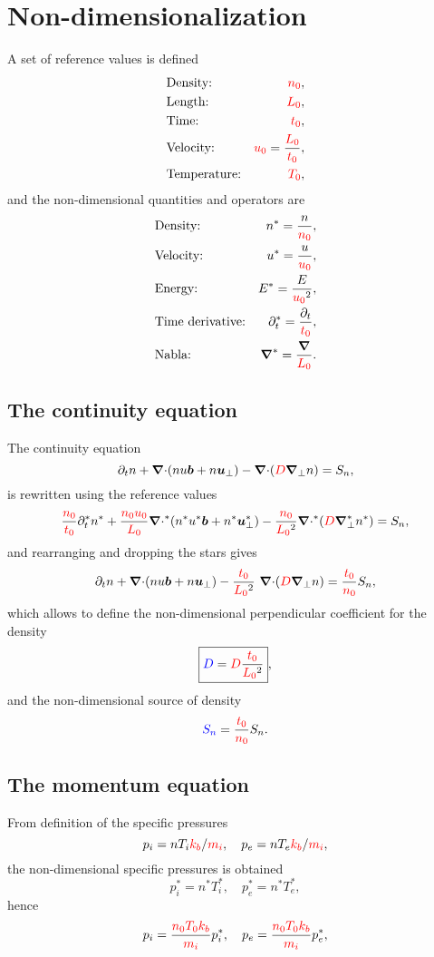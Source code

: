 \documentclass[a4paper,10pt]{article}
\newcommand{\bm}[1]{\text{\boldmath$#1$\unboldmath}}
\newcommand{\bu}{\bm{u}}
\newcommand{\Div}{{\bm{\nabla}\cdot}}
\newcommand{\Grad}{\bm{\nabla}}
\renewcommand{\b}{\bm{b}}
\newcommand{\Gradper}{\Grad_{\perp}}
\newcommand{\yd}[1]{{\color{red} #1\color{black}}} %
\newcommand{\nd}[1]{{\color{blue} #1\color{black}}} %
\def\Lz{\yd{L_0}}
\def\tz{\yd{t_0}}
\def\nz{\yd{n_0}}
\def\uz{\yd{u_0}}
\def\Tz{\yd{T_0}}
\def\kb{\yd{k_b}}
\def\mi{\yd{m_i}}
\def\drho{\yd{D}}
\def\drhoa{\nd{D}}
\begin{document}
\section{Non-dimensionalization}
A set of reference values is defined
\begin{align*}
 &\text{Density:}     & \nz,\\
 &\text{Length:}      & \Lz,\\
 &\text{Time:}        & \tz,\\
 &\text{Velocity:}    & \uz=\frac{\Lz}{\tz},\\
 &\text{Temperature:} & \Tz,\\
\end{align*}
and the non-dimensional quantities and operators are
\begin{align*}
 &\text{Density:}          & n^*=\frac{n}{\nz},\\
 &\text{Velocity:}           & u^*=\frac{u}{\uz},\\
 &\text{Energy:}           & E^*=\frac{E}{\uz^2},\\
 &\text{Time derivative:}  & \partial_t^*=\frac{\partial_t}{\tz},\\
 &\text{Nabla:}            & \Grad^*= \frac{\Grad}{\Lz}.
\end{align*}


\subsection{The continuity equation}
The continuity equation 
\[
\partial_tn + \Div (nu\b + n \bu_\bot) - \Div (\drho \Gradper n) = S_n,
\]
is rewritten using the reference values
\[
\frac{\nz}{\tz}\partial^*_t n^* + \frac{\nz \uz}{\Lz}\Div^* (n^*u^*\b + n^* \bu_\bot^*) - \frac{\nz }{\Lz^2}\Div^* (\drho \Gradper^* n^*) = S_n,
\]
and rearranging and dropping the stars gives
\begin{equation}\label{eq:cont-ad}
\partial_tn + \Div (nu\b + n \bu_\bot) - \frac{\tz}{\Lz^2}\ \Div (\drho \Gradper n) = \frac{\tz}{\nz} S_n,
\end{equation}
which allows to define the non-dimensional perpendicular coefficient for the density
\begin{equation}
\boxed{
\drhoa = \drho \frac{\tz}{\Lz^2}
},
\end{equation}
and the non-dimensional source of density
\[
 \nd{S_{n}} =\frac{\tz}{\nz} S_{n}.
\]





\subsection{The momentum equation}
From definition of the specific pressures 
\[
 p_i=nT_i\kb/\mi,\quad p_e=nT_e\kb/\mi,
\]
the non-dimensional specific pressures is obtained
\begin{equation*}
 p_i^*=n^*T_i^*,\quad p_e^*=n^*T_e^*,
\end{equation*}
hence
\begin{equation}\label{eq:pres-ad}
p_i=\frac{\nz \Tz \kb}{\mi} p_i^*,\quad p_e=\frac{\nz \Tz \kb}{\mi} p_e^*,
\end{equation}
\end{document}
